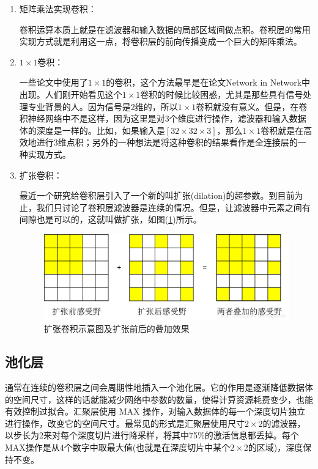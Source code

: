 \documentclass[UTF-8, a4paper, 12pt]{ctexart}
\begin{document}
\begin{enumerate}
    \item 矩阵乘法实现卷积：
    
    卷积运算本质上就是在滤波器和输入数据的局部区域间做点积。卷积层的常用实现方式就是利用这一点，将卷积层的前向传播变成一个巨大的矩阵乘法。

    \item $1\times 1$卷积：
    
    一些论文中使用了$1\times 1$的卷积，这个方法最早是在论文Network in Network中出现。人们刚开始看见这个$1\times 1$卷积的时候比较困惑，尤其是那些具有信号处理专业背景的人。因为信号是2维的，所以$1\times 1$卷积就没有意义。但是，在卷积神经网络中不是这样，因为这里是对3个维度进行操作，滤波器和输入数据体的深度是一样的。比如，如果输入是$[32\times 32\times 3]$，那么$1\times 1$卷积就是在高效地进行3维点积；另外的一种想法是将这种卷积的结果看作是全连接层的一种实现方式。

    \item 扩张卷积：
    
    最近一个研究给卷积层引入了一个新的叫扩张(dilation)的超参数。到目前为止，我们只讨论了卷积层滤波器是连续的情况。但是，让滤波器中元素之间有间隙也是可以的，这就叫做扩张，如图(\ref{f5})所示。
    \begin{figure}[htbp]
        \centering
        \includegraphics[width=15cm]{fig/f5.jpg}
        \caption{扩张卷积示意图及扩张前后的叠加效果}
        \label{f5}
    \end{figure}
\end{enumerate}

\subsection{池化层}

通常在连续的卷积层之间会周期性地插入一个池化层。它的作用是逐渐降低数据体的空间尺寸，这样的话就能减少网络中参数的数量，使得计算资源耗费变少，也能有效控制过拟合。汇聚层使用 MAX 操作，对输入数据体的每一个深度切片独立进行操作，改变它的空间尺寸。最常见的形式是汇聚层使用尺寸$2\times 2$的滤波器，以步长为2来对每个深度切片进行降采样，将其中75\%的激活信息都丢掉。每个MAX操作是从4个数字中取最大值(也就是在深度切片中某个$2\times 2$的区域)，深度保持不变。
\end{document}
